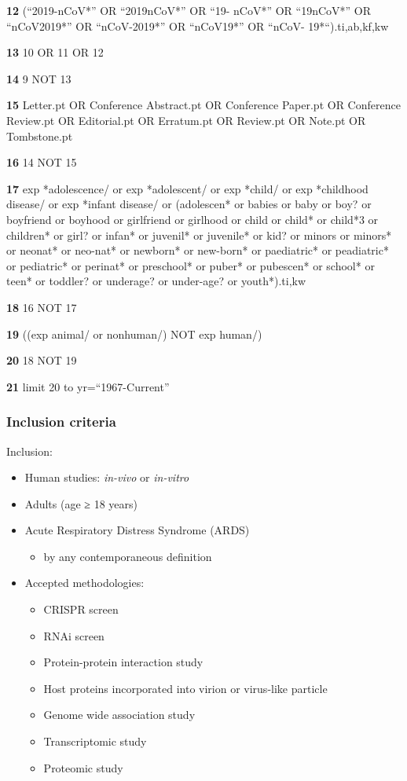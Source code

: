\documentclass[
  11,
  a4paper,
]{article}
\providecommand{\tightlist}{%
  \setlength{\itemsep}{0pt}\setlength{\parskip}{0pt}}\usepackage{longtable,booktabs,array}
\begin{document}
\textbf{12} (``2019-nCoV*'' OR ``2019nCoV*'' OR ``19- nCoV*'' OR
``19nCoV*'' OR ``nCoV2019*'' OR ``nCoV-2019*'' OR ``nCoV19*'' OR ``nCoV-
19*``).ti,ab,kf,kw

\textbf{13} 10 OR 11 OR 12

\textbf{14} 9 NOT 13

\textbf{15} Letter.pt OR Conference Abstract.pt OR Conference Paper.pt
OR Conference Review.pt OR Editorial.pt OR Erratum.pt OR Review.pt OR
Note.pt OR Tombstone.pt

\textbf{16} 14 NOT 15

\textbf{17} exp *adolescence/ or exp *adolescent/ or exp *child/ or exp
*childhood disease/ or exp *infant disease/ or (adolescen* or babies or
baby or boy? or boyfriend or boyhood or girlfriend or girlhood or child
or child* or child*3 or children* or girl? or infan* or juvenil* or
juvenile* or kid? or minors or minors* or neonat* or neo-nat* or
newborn* or new-born* or paediatric* or peadiatric* or pediatric* or
perinat* or preschool* or puber* or pubescen* or school* or teen* or
toddler? or underage? or under-age? or youth*).ti,kw

\textbf{18} 16 NOT 17

\textbf{19} ((exp animal/ or nonhuman/) NOT exp human/)

\textbf{20} 18 NOT 19

\textbf{21} limit 20 to yr=``1967-Current''

\newpage

\hypertarget{inclusion-criteria}{%
\subsubsection{Inclusion criteria}\label{inclusion-criteria}}

Inclusion:

\begin{itemize}
\tightlist
\item
  Human studies: \emph{in-vivo} or \emph{in-vitro}
\item
  Adults (age ≥ 18 years)
\item
  Acute Respiratory Distress Syndrome (ARDS)

  \begin{itemize}
  \tightlist
  \item
    by any contemporaneous definition
  \end{itemize}
\item
  Accepted methodologies:

  \begin{itemize}
  \tightlist
  \item
    CRISPR screen
  \item
    RNAi screen
  \item
    Protein-protein interaction study
  \item
    Host proteins incorporated into virion or virus-like particle
  \item
    Genome wide association study
  \item
    Transcriptomic study
  \item
    Proteomic study
  \end{itemize}
\end{itemize}
\end{document}
